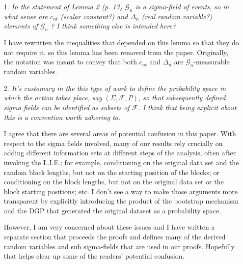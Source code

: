 \documentclass[12pt]{article}
\begin{document}
\begin{enumerate}
\item[1.] \emph{In the statement of Lemma 2 (p. 13) $\mathcal{G}_n$ is a
    sigma-field of events, so in what sense are $c_{nt}$ (scalar
    constant?)  and $\Delta_n$ (real random variable?) elements of
    $\mathcal{G}_n$ ? I think something else is intended here?}

  I have rewritten the inequalities that depended on this lemma so
  that they do not require it, so this lemma has been removed from the
  paper. Originally, the notation was meant to convey that both
  $c_{nt}$ and $\Delta_n$ are $\mathcal{G}_n$-measurable random
  variables.

\item[2.] \emph{It's customary in the this type of work to define the
    probability space in which the action takes place, say $(\Sigma,
    \mathcal{F}, P)$, so that subsequently defined sigma fields can be
    identified as subsets of $\mathcal{F}$. I think that being
    explicit about this is a convention worth adhering to.}

  I agree that there are several areas of potential confusion in this
  paper. With respect to the sigma fields involved, many of our
  results rely crucially on adding different information sets at
  different steps of the analysis, often after invoking the L.I.E.;
  for example, conditioning on the original data set and the random
  block lengths, but not on the starting position of the blocks; or
  conditioning on the block lengths, but not on the original data set
  or the block starting positions; etc. I don't see a way to make
  those arguments more transparent by explicitly introducing the
  product of the bootstrap mechanism and the DGP that generated the
  original dataset as a probability space.

  However, I am very concerned about these issues and I have written a
  separate section that proceeds the proofs and defines many of the
  derived random variables and sub sigma-fields that are used in our
  proofs. Hopefully that helps clear up some of the readers' potential
  confusion.

\end{enumerate}
\end{document}
